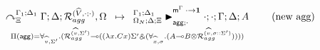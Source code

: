 \begin{align}
\underset{
   \Pi(\m{agg}) = \forall_{\widehat{v}, \Sigma'}.
   (\defstwo{agg}{\widehat{v}}{\Sigma'} \lolli ((\lambda x. C x)\Sigma' \with (\forall_{\widehat{x}, \sigma}.
                                                (A \lolli B \otimes
                                                 \defstwo{agg}{\widehat{v}}{\sigma
                                                 ::\Sigma'}))))
}
{
   \trans{
         \derstatex{\Gamma}{\Delta}{\Xi}{\Gamma_1}{\Delta_1}{\defstwo{agg}{\widehat{V}}{\cdot
         ; \cdot}, \Omega}
   }
   {\matstatea{\Delta}{\cdot ; \cdot}{\Gamma}{\Delta}{A}{\cdot \rightarrow
      \one}{\cdot}}
} \tag{new agg}
\end{align}

